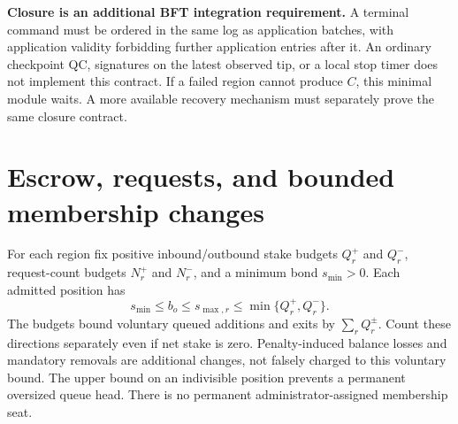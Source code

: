 \documentclass[11pt,a4paper]{article}
\begin{document}
\textbf{Closure is an additional BFT integration requirement.}
A terminal command must be ordered in the same log as application batches,
with application validity forbidding further application entries after it.
An ordinary checkpoint QC, signatures on the latest observed tip, or a
local stop timer does not implement this contract. If a failed region
cannot produce $C$, this minimal module waits. A more available recovery
mechanism must separately prove the same closure contract.

\section{Escrow, requests, and bounded membership changes}
\label{sec:stake}

For each region fix positive inbound/outbound stake budgets $Q_r^+$ and
$Q_r^-$, request-count budgets $N_r^+$ and $N_r^-$, and a minimum bond
$s_{\min}>0$. Each admitted position has
\[
s_{\min}\le b_o\le s_{\max,r}\le\min\{Q_r^+,Q_r^-\}.
\]
The budgets bound voluntary queued additions and exits by
$\sum_r Q_r^\pm$. Count these directions separately even if net stake is
zero. Penalty-induced balance losses and mandatory removals are additional
changes, not falsely charged to this voluntary bound.
The upper bound on an indivisible position prevents a permanent oversized
queue head. There is no permanent administrator-assigned membership seat.
\end{document}
